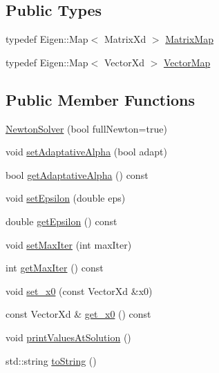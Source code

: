 \subsection*{Public Types}
\begin{DoxyCompactItemize}
\item 
typedef Eigen\+::\+Map$<$ Matrix\+Xd $>$ \hyperlink{classocra_1_1NewtonSolver_a53e3463c336170efa3819d725c9b16e3}{Matrix\+Map}
\item 
typedef Eigen\+::\+Map$<$ Vector\+Xd $>$ \hyperlink{classocra_1_1NewtonSolver_aad21c090baadce638c9613f4b9d1d5c4}{Vector\+Map}
\end{DoxyCompactItemize}
\subsection*{Public Member Functions}
\begin{DoxyCompactItemize}
\item 
\hyperlink{classocra_1_1NewtonSolver_ab66a0ba4ef83a14fd2c7b39c2bae78b9}{Newton\+Solver} (bool full\+Newton=true)
\item 
void \hyperlink{classocra_1_1NewtonSolver_ade438475c7a8ffdc2bb60097639b8e27}{set\+Adaptative\+Alpha} (bool adapt)
\item 
bool \hyperlink{classocra_1_1NewtonSolver_aa0f49d597e69f641c28e35b038e91d99}{get\+Adaptative\+Alpha} () const
\item 
void \hyperlink{classocra_1_1NewtonSolver_ac128bd9e9d7c05ae3e91bddb362e7165}{set\+Epsilon} (double eps)
\item 
double \hyperlink{classocra_1_1NewtonSolver_a33f31688cb71c2ed817e3dbd40c0352f}{get\+Epsilon} () const
\item 
void \hyperlink{classocra_1_1NewtonSolver_a7bea41cafca30faf5dca35a7e3bd8a2e}{set\+Max\+Iter} (int max\+Iter)
\item 
int \hyperlink{classocra_1_1NewtonSolver_a044aa506a35d0a60bf8c5e4e7108dfae}{get\+Max\+Iter} () const
\item 
void \hyperlink{classocra_1_1NewtonSolver_a4fc7eba127f6975a0e8947f39d24629a}{set\+\_\+x0} (const Vector\+Xd \&x0)
\item 
const Vector\+Xd \& \hyperlink{classocra_1_1NewtonSolver_a073daf2d70c780313d28d34e6c8bbea2}{get\+\_\+x0} () const
\item 
void \hyperlink{classocra_1_1NewtonSolver_a92d33f1dfe684de2051d0389816cf9a5}{print\+Values\+At\+Solution} ()
\item 
std\+::string \hyperlink{classocra_1_1NewtonSolver_a3d498cc7771cf3cf733552a35fd77006}{to\+String} ()
\end{DoxyCompactItemize}
